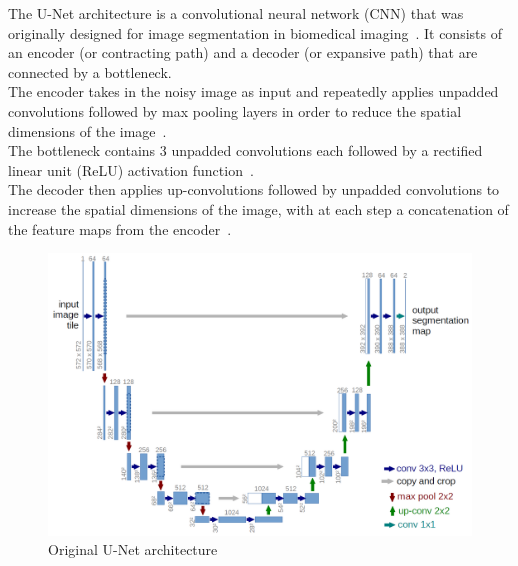 \documentclass{article}
\numberwithin{equation}{section}
\numberwithin{figure}{section}
\begin{document}
The U-Net architecture is a convolutional neural network (CNN) that was originally designed for image segmentation in biomedical imaging~\cite{ronneberger2015unet}. It consists of an encoder (or contracting path) and a decoder (or expansive path) that are connected by a bottleneck. \\
The encoder takes in the noisy image as input and repeatedly applies unpadded convolutions followed by max pooling layers in order to reduce the spatial dimensions of the image~\cite{ronneberger2015unet}. \\
The bottleneck contains 3 unpadded convolutions each followed by a rectified linear unit (ReLU) activation function~\cite{ronneberger2015unet}. \\
The decoder then applies up-convolutions followed by unpadded convolutions to increase the spatial dimensions of the image, with at each step a concatenation of the feature maps from the encoder~\cite{ronneberger2015unet}.
\begin{figure}[h]
  \includegraphics[width=\textwidth]{images/unet.png}
  \caption{Original U-Net architecture~\cite{ronneberger2015unet}}
\end{figure}
\end{document}
